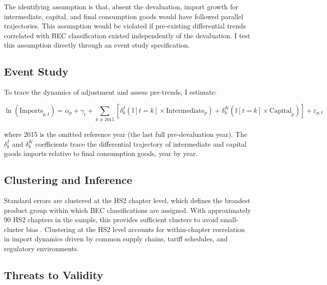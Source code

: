 \documentclass[12pt]{article}
\newcommand{\ind}{\mathbb{I}}
\begin{document}
The identifying assumption is that, absent the devaluation, import growth for intermediate, capital, and final consumption goods would have followed parallel trajectories. This assumption would be violated if pre-existing differential trends correlated with BEC classification existed independently of the devaluation. I test this assumption directly through an event study specification.

\subsection{Event Study}

To trace the dynamics of adjustment and assess pre-trends, I estimate:

\begin{equation}
\ln(\text{Imports}_{p,t}) = \alpha_p + \gamma_t + \sum_{k \neq 2015} \left[ \delta_k^I (\ind[t=k] \times \text{Intermediate}_p) + \delta_k^K (\ind[t=k] \times \text{Capital}_p) \right] + \varepsilon_{p,t}
\label{eq:eventstudy}
\end{equation}

where 2015 is the omitted reference year (the last full pre-devaluation year). The $\delta_k^I$ and $\delta_k^K$ coefficients trace the differential trajectory of intermediate and capital goods imports relative to final consumption goods, year by year.

\subsection{Clustering and Inference}

Standard errors are clustered at the HS2 chapter level, which defines the broadest product group within which BEC classifications are assigned. With approximately 90 HS2 chapters in the sample, this provides sufficient clusters to avoid small-cluster bias \citep{cameron2015practitioners}. Clustering at the HS2 level accounts for within-chapter correlation in import dynamics driven by common supply chains, tariff schedules, and regulatory environments.

\subsection{Threats to Validity}
\end{document}

